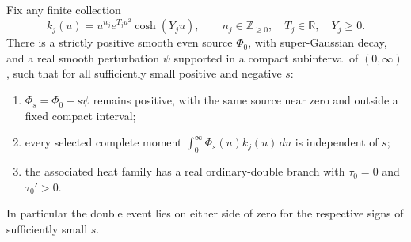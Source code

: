 \begin{theorem}
\label{s:finite-moment-control}
Fix any finite collection
\begin{equation}
 k_j(u)=u^{n_j}e^{T_ju^2}\cosh(Y_ju),\qquad
 n_j\in\mathbb Z_{\ge0},\quad T_j\in\mathbb R,\quad Y_j\ge0.
 \label{s:envelope-moments}
\end{equation}
There is a strictly positive smooth even source $\Phi_0$, with
super-Gaussian decay, and a real smooth perturbation $\psi$ supported
in a compact subinterval of $(0,\infty)$, such that for all sufficiently
small positive and negative $s$:
\begin{enumerate}
 \item $\Phi_s=\Phi_0+s\psi$ remains positive, with the same source
       near zero and outside a fixed compact interval;
 \item every selected complete moment
       $\int_0^\infty\Phi_s(u)k_j(u)\,du$ is independent of $s$;
 \item the associated heat family has a real ordinary-double branch
       with $\tau_0=0$ and $\tau_0'>0$.
\end{enumerate}
In particular the double event lies on either side of zero for the
respective signs of sufficiently small $s$.
\end{theorem}


